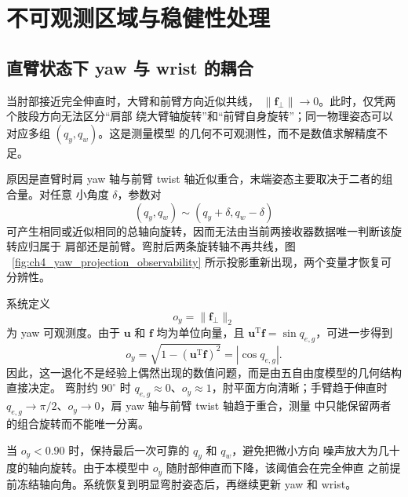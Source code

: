 \section{不可观测区域与稳健性处理}
\label{sec:ch4_observability_robustness}

\subsection{直臂状态下 yaw 与 wrist 的耦合}
\label{subsec:ch4_yaw_wrist_unobservable}

当肘部接近完全伸直时，大臂和前臂方向近似共线，
$\lVert\boldsymbol f_{\perp}\rVert\rightarrow0$。此时，仅凭两个肢段方向无法区分“肩部
绕大臂轴旋转”和“前臂自身旋转”；同一物理姿态可以对应多组 $(q_y,q_w)$。这是测量模型
的几何不可观测性，而不是数值求解精度不足。

原因是直臂时肩 yaw 轴与前臂 twist 轴近似重合，末端姿态主要取决于二者的组合量。对任意
小角度 $\delta$，参数对
\begin{equation}
  (q_y,q_w)\sim(q_y+\delta,q_w-\delta)
  \label{eq:ch4_yaw_wrist_equivalent_pairs}
\end{equation}
可产生相同或近似相同的总轴向旋转，因而无法由当前两接收器数据唯一判断该旋转应归属于
肩部还是前臂。弯肘后两条旋转轴不再共线，图
~\ref{fig:ch4_yaw_projection_observability} 所示投影重新出现，两个变量才恢复可分辨性。

系统定义
\begin{equation}
  o_y=\lVert\boldsymbol f_{\perp}\rVert_2
  \label{eq:ch4_yaw_observability}
\end{equation}
为 yaw 可观测度。由于 $\boldsymbol u$ 和 $\boldsymbol f$ 均为单位向量，且
$\boldsymbol u^{\mathrm T}\boldsymbol f=\sin q_{e,g}$，可进一步得到
\begin{equation}
  o_y=\sqrt{1-(\boldsymbol u^{\mathrm T}\boldsymbol f)^2}
  =|\cos q_{e,g}|.
  \label{eq:ch4_yaw_observability_elbow_relation}
\end{equation}
因此，这一退化不是经验上偶然出现的数值问题，而是由五自由度模型的几何结构直接决定。
弯肘约 $90^\circ$ 时 $q_{e,g}\approx0$、$o_y\approx1$，肘平面方向清晰；手臂趋于伸直时
$q_{e,g}\rightarrow\pi/2$、$o_y\rightarrow0$，肩 yaw 轴与前臂 twist 轴趋于重合，测量
中只能保留两者的组合旋转而不能唯一分离。

当 $o_y<0.90$ 时，保持最后一次可靠的 $q_y$ 和 $q_w$，避免把微小方向
噪声放大为几十度的轴向旋转。由于本模型中 $o_y$ 随肘部伸直而下降，该阈值会在完全伸直
之前提前冻结轴向角。系统恢复到明显弯肘姿态后，再继续更新 yaw 和 wrist。

